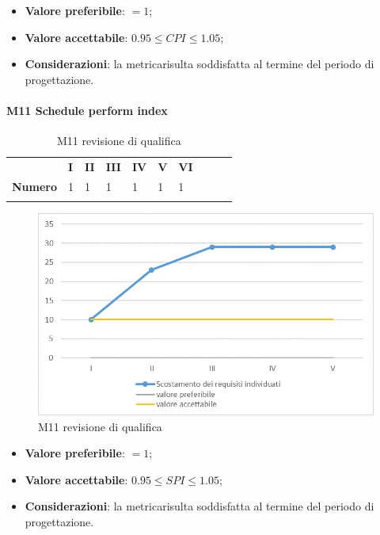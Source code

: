 \begin{itemize}
\begin{itemize}
	\item \textbf{Valore preferibile}: $=1$;
	\item \textbf{Valore accettabile}: $0.95 \le CPI \le 1.05$;
	\item \textbf{Considerazioni}: la metrica\glosp risulta soddisfatta al termine del periodo di progettazione\glo.
\end{itemize}

\paragraph{M11 Schedule perform index} \mbox{}
\begin{longtable}[H!] {						
		>{}p{50mm}  		
		>{}p{8mm}
		>{}p{8mm}		
		>{}p{8mm}		
		>{}p{8mm}		
		>{}p{8mm}		
		>{}p{8mm}
		>{}p{8mm}
		>{}p{8mm}
		>{}p{8mm}
	}
	\rowcolor{gray!50}
	\textbf{} & \textbf{I} & \textbf{II} & \textbf{III} & \textbf{IV} & \textbf{V} & \textbf{VI} \TBstrut \\ [2mm]
	\textbf{Numero} & 1 & 1 & 1 & 1 & 1 & 1 \TBstrut \\ [2mm]
	\rowcolor{white}
	\caption{M11 revisione di qualifica}
\end{longtable}
\begin{figure}[H] 	
	\includegraphics[width=\linewidth]{./img/grafici/RP1.png}	
	\caption{M11 revisione di qualifica}	
\end{figure}
\begin{itemize}
	\begin{itemize}
		\item \textbf{Valore preferibile}: $=1$;
		\item \textbf{Valore accettabile}: $0.95 \le SPI \le 1.05$;
		\item \textbf{Considerazioni}: la metrica\glosp risulta soddisfatta al termine del periodo di progettazione\glo.
	\end{itemize}


\end{itemize}
\end{itemize}
